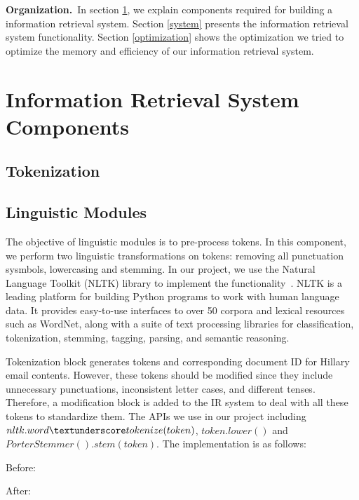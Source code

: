 \documentclass[journal]{IEEEtran}
\begin{document}
\textbf{Organization.}~In section \ref{components}, we explain components required for building a information retrieval system. Section \ref{system} presents the information retrieval system functionality. Section \ref{optimization} shows the optimization we tried to optimize the memory and efficiency of our information retrieval system.

\section{Information Retrieval System Components}\label{components}
\subsection{Tokenization}

\subsection{Linguistic Modules}

The objective of linguistic modules is to pre-process tokens. In this component, we perform two linguistic transformations on tokens: removing all punctuation sysmbols, lowercasing and stemming. In our project, we use the Natural Language Toolkit (NLTK) library to implement the functionality~\cite{Loper02nltk:the}. 
NLTK is a leading platform for building Python programs to work with human language data. It provides easy-to-use interfaces to over 50 corpora and lexical resources such as WordNet, along with a suite of text processing libraries for classification, tokenization, stemming, tagging, parsing, and semantic reasoning.

Tokenization block generates tokens and corresponding document ID for Hillary email contents. However, these tokens should be modified since they include unnecessary punctuations, inconsistent letter cases, and different tenses. Therefore, a modification block is added to the IR system to deal with all these tokens to standardize them.
The APIs we use in our project including $nltk.word\textunderscore tokenize(token)$, $token.lower()$ and $PorterStemmer().stem(token)$. The implementation is as follows:

Before:

After:
\end{document}
